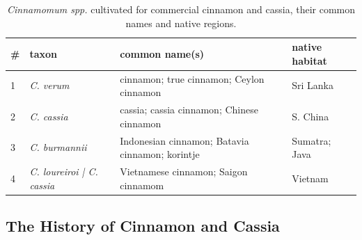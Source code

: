 \begin{table}[!ht]
\centering
\begin{tabularx}{\linewidth}{@{}llXl@{}}
\toprule
\textbf{\#} & \textbf{taxon} & \textbf{common name(s)} & \textbf{native habitat} \\ \midrule
1           & \textit{C. verum}     & cinnamon; true cinnamon; Ceylon cinnamon & Sri Lanka \\
2           & \textit{C. cassia}    & cassia; cassia cinnamon; Chinese cinnamon & S. China \\
3           & \textit{C. burmannii}  & Indonesian cinnamon; Batavia cinnamon; korintje  & Sumatra; Java \\
4           & \textit{C. loureiroi | C. cassia} & Vietnamese cinnamon; Saigon cinnamom & Vietnam \\ \bottomrule
\end{tabularx}
\caption{\textit{Cinnamomum spp.} cultivated for commercial cinnamon and cassia, their common names and native regions.}
\label{table:cinnamomum_spp}
\end{table}





\subsection{The History of Cinnamon and Cassia}

